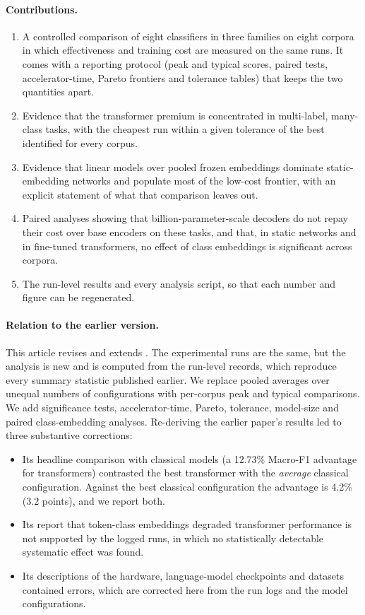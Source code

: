 \documentclass{ijis}
\begin{document}
\paragraph{Contributions.}
\begin{enumerate}
\setlength\itemsep{1pt}
\item[(i)] A controlled comparison of eight classifiers in three families on eight corpora in which effectiveness and training cost are measured on the same runs. It comes with a reporting protocol (peak and typical scores, paired tests, accelerator-time, Pareto frontiers and tolerance tables) that keeps the two quantities apart.
\item[(ii)] Evidence that the transformer premium is concentrated in multi-label, many-class tasks, with the cheapest run within a given tolerance of the best identified for every corpus.
\item[(iii)] Evidence that linear models over pooled frozen embeddings dominate static-embedding networks and populate most of the low-cost frontier, with an explicit statement of what that comparison leaves out.
\item[(iv)] Paired analyses showing that billion-parameter-scale decoders do not repay their cost over base encoders on these tasks, and that, in static networks and in fine-tuned transformers, no effect of class embeddings is significant across corpora.
\item[(v)] The run-level results and every analysis script, so that each number and figure can be regenerated.
\end{enumerate}

\paragraph{Relation to the earlier version.} This article revises and extends \cite{worth2025layercake}. The experimental runs are the same, but the analysis is new and is computed from the run-level records, which reproduce every summary statistic published earlier. We replace pooled averages over unequal numbers of configurations with per-corpus peak and typical comparisons. We add significance tests, accelerator-time, Pareto, tolerance, model-size and paired class-embedding analyses. Re-deriving the earlier paper's results led to three substantive corrections:
\begin{itemize}
\setlength\itemsep{1pt}
\item Its headline comparison with classical models (a 12.73\% Macro-F1 advantage for transformers) contrasted the best transformer with the \emph{average} classical configuration. Against the best classical configuration the advantage is 4.2\% (3.2 points), and we report both.
\item Its report that token-class embeddings degraded transformer performance is not supported by the logged runs, in which no statistically detectable systematic effect was found.
\item Its descriptions of the hardware, language-model checkpoints and datasets contained errors, which are corrected here from the run logs and the model configurations.
\end{itemize}
\end{document}
